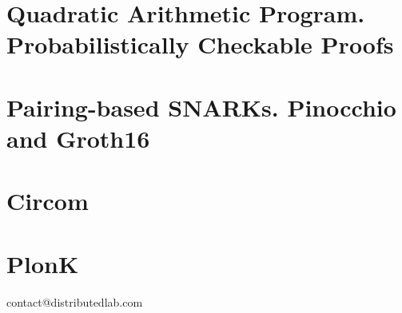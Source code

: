 \documentclass{zkdl-template}
\begin{document}
\label{section:circuits}

\section[Quadratic Arithmetic Program]{Quadratic Arithmetic Program. Probabilistically Checkable Proofs}



\section[Pairing-based SNARKs]{Pairing-based SNARKs. Pinocchio and Groth16}



\section{Circom}\label{section:circom}



\section{PlonK}\label{section:plonk}




    \newpage
    \pagestyle{empty}
    
    \ifodd\value{page}
        \newpage
    \fi
    
    \vspace*{\fill}
    
    \begin{center}
        contact@distributedlab.com
    \end{center}
    
    \vspace*{\fill}
\end{document}
